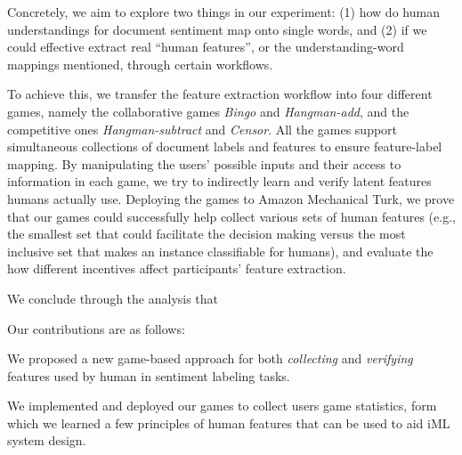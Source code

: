 \documentclass[chi_draft]{sigchi}
\begin{document}
Concretely, we aim to explore two things in our experiment: (1) how do human understandings for document sentiment map onto single words, and (2) if we could effective extract real ``human features'', or the understanding-word mappings mentioned, through certain workflows.

To achieve this, we transfer the feature extraction workflow into four different games, namely the collaborative games \emph{Bingo} and \emph{Hangman-add}, and the competitive ones \emph{Hangman-subtract} and \emph{Censor}.
All the games support simultaneous collections of document labels and features to ensure feature-label mapping.
By manipulating the users' possible inputs and their access to information in each game, we try to indirectly learn and verify latent features humans actually use. 
Deploying the games to Amazon Mechanical Turk, we prove that our games could successfully help collect various sets of human features (e.g., the smallest set that could facilitate the decision making versus the most inclusive set that makes an instance classifiable for humans), and evaluate the how different incentives affect participants' feature extraction. 

We conclude through the analysis that 

Our contributions are as follows:
\begin{compactitem}
	\item We proposed a new game-based approach for both \emph{collecting} and \emph{verifying} features used by human in sentiment labeling tasks.
  \item We implemented and deployed our games to collect users game statistics, form which we learned a few principles of human features that can be used to aid iML system design.
  \item {} 
\end{compactitem}


\end{document}
